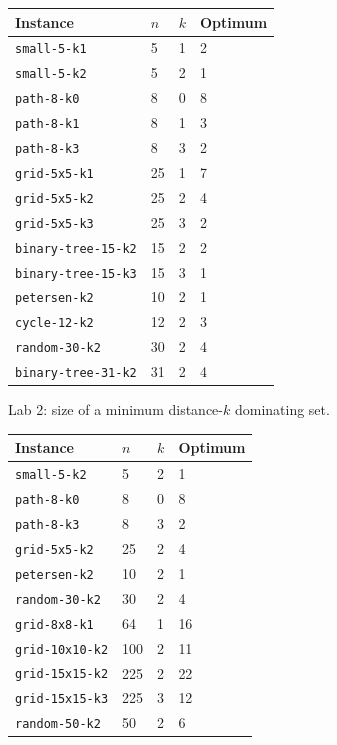 \documentclass[11pt]{article}
\begin{document}
\begin{center}
\small
\begin{tabular}{llll}
\toprule
Instance & $n$ & $k$ & Optimum \\
\midrule
\mbox{\texttt{small-{}5-{}k1}} & 5 & 1 & 2 \\
\mbox{\texttt{small-{}5-{}k2}} & 5 & 2 & 1 \\
\mbox{\texttt{path-{}8-{}k0}} & 8 & 0 & 8 \\
\mbox{\texttt{path-{}8-{}k1}} & 8 & 1 & 3 \\
\mbox{\texttt{path-{}8-{}k3}} & 8 & 3 & 2 \\
\mbox{\texttt{grid-{}5x5-{}k1}} & 25 & 1 & 7 \\
\mbox{\texttt{grid-{}5x5-{}k2}} & 25 & 2 & 4 \\
\mbox{\texttt{grid-{}5x5-{}k3}} & 25 & 3 & 2 \\
\mbox{\texttt{binary-{}tree-{}15-{}k2}} & 15 & 2 & 2 \\
\mbox{\texttt{binary-{}tree-{}15-{}k3}} & 15 & 3 & 1 \\
\mbox{\texttt{petersen-{}k2}} & 10 & 2 & 1 \\
\mbox{\texttt{cycle-{}12-{}k2}} & 12 & 2 & 3 \\
\mbox{\texttt{random-{}30-{}k2}} & 30 & 2 & 4 \\
\mbox{\texttt{binary-{}tree-{}31-{}k2}} & 31 & 2 & 4 \\
\bottomrule
\end{tabular}
\end{center}

Lab 2: size of a minimum distance-$k$ dominating set.

\begin{center}
\small
\begin{tabular}{llll}
\toprule
Instance & $n$ & $k$ & Optimum \\
\midrule
\mbox{\texttt{small-{}5-{}k2}} & 5 & 2 & 1 \\
\mbox{\texttt{path-{}8-{}k0}} & 8 & 0 & 8 \\
\mbox{\texttt{path-{}8-{}k3}} & 8 & 3 & 2 \\
\mbox{\texttt{grid-{}5x5-{}k2}} & 25 & 2 & 4 \\
\mbox{\texttt{petersen-{}k2}} & 10 & 2 & 1 \\
\mbox{\texttt{random-{}30-{}k2}} & 30 & 2 & 4 \\
\mbox{\texttt{grid-{}8x8-{}k1}} & 64 & 1 & 16 \\
\mbox{\texttt{grid-{}10x10-{}k2}} & 100 & 2 & 11 \\
\mbox{\texttt{grid-{}15x15-{}k2}} & 225 & 2 & 22 \\
\mbox{\texttt{grid-{}15x15-{}k3}} & 225 & 3 & 12 \\
\mbox{\texttt{random-{}50-{}k2}} & 50 & 2 & 6 \\
\bottomrule
\end{tabular}
\end{center}
\end{document}
